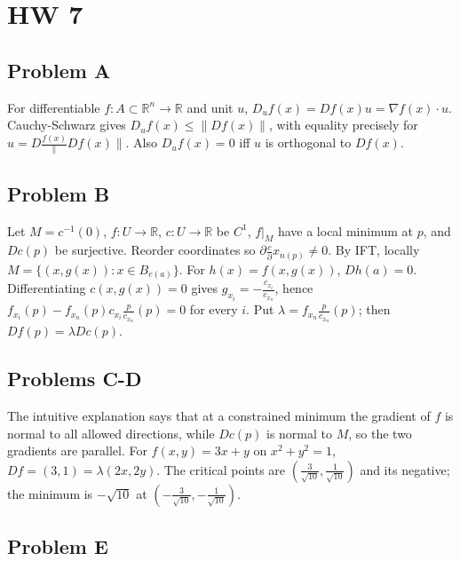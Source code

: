 \chapter{HW 7}

\section{Problem A}

For differentiable \(f:A \subset \mathbb{R}^{n}\rightarrow\mathbb{R}\) and unit \(u\), \(D_{u}f(x) = Df(x)u = \nabla f(x) \cdot u\). Cauchy-Schwarz gives \(D_{u}f(x) \leq \| Df(x)\|\), with equality precisely for \(u = D\frac{f(x)}{\|}Df(x)\|\). Also \(D_{u}f(x) = 0\) iff \(u\) is orthogonal to \(Df(x)\).

\section{Problem B}

Let \(M = c^{- 1}(0)\), \(f:U\rightarrow\mathbb{R}\), \(c:U\rightarrow\mathbb{R}\) be \(C^{1}\), \(f|_{M}\) have a local minimum at \(p\), and \(Dc(p)\) be surjective. Reorder coordinates so \(\partial\frac{c}{\partial}x_{n{(p)}} \neq 0\). By IFT, locally \(M = \{\left( {x,g(x)} \right):x \in B_{e{(a)}}\}\). For \(h(x) = f\left( {x,g(x)} \right)\), \(Dh(a) = 0\). Differentiating \(c\left( {x,g(x)} \right) = 0\) gives \(g_{x_{i}} = - \frac{c_{x_{i}}}{c_{x_{n}}}\), hence \(f_{x_{i}}(p) - f_{x_{n}}(p)c_{x_{i}}\frac{p}{c_{x_{n}}}(p) = 0\) for every \(i\). Put \(\lambda = f_{x_{n}}\frac{p}{c_{x_{n}}}(p)\); then \(Df(p) = \lambda Dc(p)\).

\section{Problems C-D}

The intuitive explanation says that at a constrained minimum the gradient of \(f\) is normal to all allowed directions, while \(Dc(p)\) is normal to \(M\), so the two gradients are parallel. For \(f\left( {x,y} \right) = 3x + y\) on \(x^{2} + y^{2} = 1\), \(Df = \left( {3,1} \right) = \lambda\left( {2x,2y} \right)\). The critical points are \(\left( {\frac{3}{\sqrt{10}},\frac{1}{\sqrt{10}}} \right)\) and its negative; the minimum is \(- \sqrt{10}\) at \(\left( {- \frac{3}{\sqrt{10}}, - \frac{1}{\sqrt{10}}} \right)\).

\section{Problem E}

